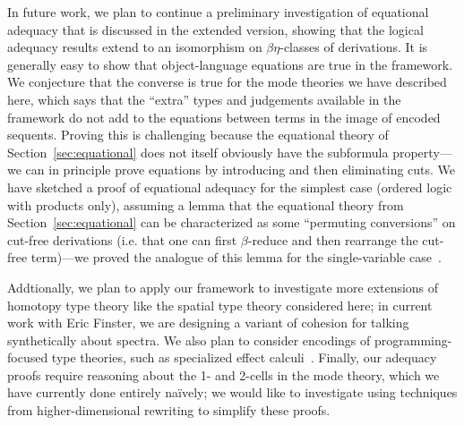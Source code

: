 
In future work, we plan to continue a preliminary investigation of
equational adequacy that is discussed in the extended version, showing
that the logical adequacy results extend to an isomorphism on
$\beta\eta$-classes of derivations.  It is generally easy to show that
object-language equations are true in the framework.  We conjecture that
the converse is true for the mode theories we have described here, which
says that the ``extra'' types and judgements available in the framework
do not add to the equations between terms in the image of encoded
sequents.  Proving this is challenging because the equational theory of
Section~\ref{sec:equational} does not itself obviously have the
subformula property---we can in principle prove equations by introducing
and then eliminating cuts.  We have sketched a proof of equational
adequacy for the simplest case (ordered logic with products only),
assuming a lemma that the equational theory from
Section~\ref{sec:equational} can be characterized as some ``permuting
conversions'' on cut-free derivations (i.e. that one can first
$\beta$-reduce and then rearrange the cut-free term)---we proved the
analogue of this lemma for the single-variable case~\citep{ls16adjoint}.

Addtionally, we plan to apply our framework to investigate more
extensions of homotopy type theory like the spatial type theory
considered here; in current work with Eric Finster, we are designing a
variant of cohesion for talking synthetically about spectra.  We also
plan to consider encodings of programming-focused type theories, such as
specialized effect calculi~\citep{gaboardi16coeffect}.  Finally, our
adequacy proofs require reasoning about the 1- and 2-cells in the mode
theory, which we have currently done entirely na\"ively; we would like
to investigate using techniques from higher-dimensional rewriting to
simplify these proofs.

